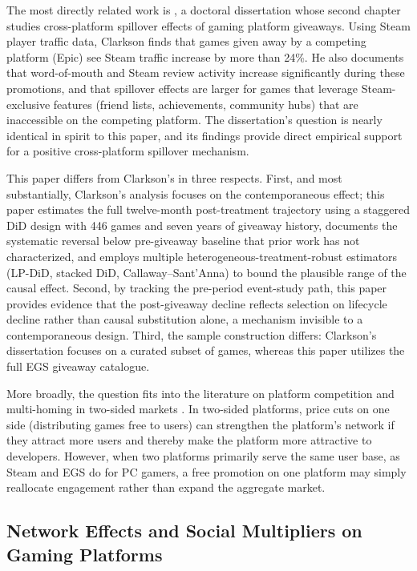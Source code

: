 \documentclass[11pt]{article}
\begin{document}
The most directly related work is \citet{clarkson2025}, a doctoral dissertation whose
second chapter studies cross-platform spillover effects of gaming
platform giveaways. Using Steam player traffic data, Clarkson finds that games given
away by a competing platform (Epic) see Steam traffic increase by more than 24\%.
He also documents that word-of-mouth and Steam review activity increase significantly
during these promotions, and that spillover effects are larger for games that leverage
Steam-exclusive features (friend lists, achievements, community hubs) that are inaccessible
on the competing platform. The dissertation's question is nearly identical in spirit
to this paper, and its findings provide direct empirical support for a positive
cross-platform spillover mechanism.

This paper differs from Clarkson's in three respects. First, and most
substantially, Clarkson's analysis focuses on the contemporaneous effect;
this paper estimates the full twelve-month post-treatment trajectory using a
staggered DiD design with 446 games and seven years of giveaway history, documents
the systematic reversal below pre-giveaway baseline that prior work has not
characterized, and employs multiple heterogeneous-treatment-robust estimators
(LP-DiD, stacked DiD, Callaway--Sant'Anna) to bound the plausible range of the
causal effect. Second, by tracking the pre-period event-study path, this paper
provides evidence that the post-giveaway decline reflects selection on lifecycle
decline rather than causal substitution alone, a mechanism invisible to a
contemporaneous design. Third, the sample construction differs: Clarkson's
dissertation focuses on a curated subset of games, whereas this paper utilizes 
the full EGS giveaway catalogue.

More broadly, the question fits into the literature on platform competition and
multi-homing in two-sided markets \citep{rochet2003}. In two-sided
platforms, price cuts on one side (distributing games free to users) can strengthen
the platform's network if they attract more users and thereby make the platform more
attractive to developers. However, when two platforms primarily serve the same user base, 
as Steam and EGS do for PC gamers, a free promotion on one platform may simply reallocate 
engagement rather than expand the aggregate market.

\subsection{Network Effects and Social Multipliers on Gaming Platforms}
\end{document}
